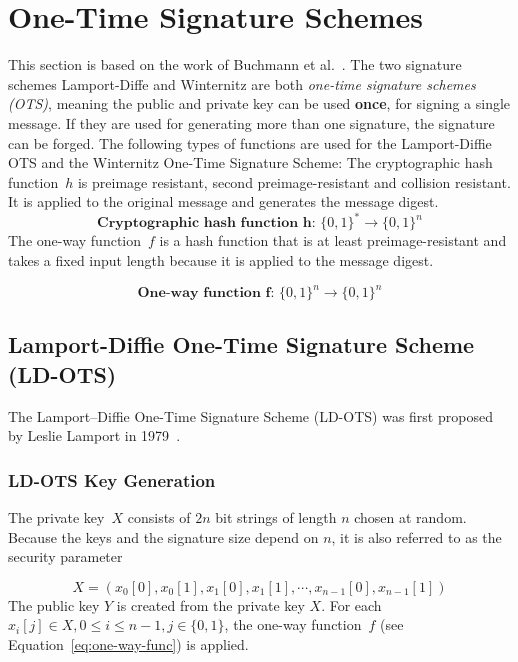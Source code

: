 \section{One-Time Signature Schemes}
\label{sec:one-time_sign_schemes}
This section is based on the work of Buchmann et al.~\cite{book_pqc_bernstein_2004}. 
The two signature schemes Lamport-Diffe and Winternitz are both \textit{one-time signature schemes (OTS)}, meaning the public and private key can be used \textbf{once}, for signing a single message. If they are used for generating more than one signature, the signature can be forged. %
The following types of functions are used for the Lamport-Diffie OTS and the Winternitz One-Time Signature Scheme: 
The cryptographic hash function~$h$ is preimage resistant, second preimage-resistant and collision resistant. It is applied to the original message and generates the message digest.
\begin{equation}
\label{eq:basic_hashfunc}
\textbf{Cryptographic hash function h: } \lbrace 0,1 \rbrace^* \rightarrow \lbrace 0,1 \rbrace^n
\end{equation}
The one-way function~$f$ is a hash function that is at least preimage-resistant and takes a fixed input length because it is applied to the message digest. 

\begin{equation}
\label{eq:one-way-func}
\textbf{One-way function f: } \lbrace 0,1 \rbrace^n \rightarrow \lbrace 0,1 \rbrace ^n
\end{equation}

\subsection{Lamport-Diffie One-Time Signature Scheme (LD-OTS)}
\label{sec:lamport_diffie_ots}
The Lamport–Diffie One-Time Signature Scheme (LD-OTS) was first proposed by Leslie Lamport in 1979~\cite{lamport_signature_scheme_1979}. 

\subsubsection{LD-OTS Key Generation}
The private key~$X$ consists of $2n$ bit strings of length $n$ chosen at random. Because the keys and the signature size depend on $n$, it is also referred to as the security parameter

\begin{equation}
\label{eq:ldots_sign_key}
X = \left(x_{0}\left[0\right], x_{0}\left[1\right], x_{1}\left[0\right], x_{1}\left[1\right], \cdots, x_{n-1}\left[0\right], x_{n-1}\left[1\right] \right)
\end{equation}
The public key $Y$ is created from the private key $X$. For each $x_i[j] \in X, 0 \leq i \leq n-1, j \in \lbrace 0,1 \rbrace$, the one-way function~$f$ (see Equation~\ref{eq:one-way-func}) is applied.

